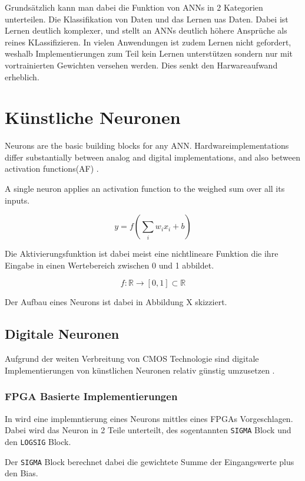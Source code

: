 \documentclass[conference]{IEEEtran}
\begin{document}
    Grundsätzlich kann man dabei die Funktion von ANNs in 2 Kategorien unterteilen.
    Die Klassifikation von Daten und das Lernen uas Daten.
    Dabei ist Lernen deutlich komplexer, und stellt an ANNs deutlich höhere Ansprüche als reines KLassifizieren.
    In vielen Anwendungen ist zudem Lernen nicht gefordert, weshalb Implementierungen zum Teil kein Lernen unterstützen sondern nur mit vortrainierten Gewichten versehen werden.
    Dies senkt den Harwareaufwand erheblich.


    \section{Künstliche Neuronen}

    Neurons are the basic building blocks for any ANN.
    Hardwareimplementations differ substantially between analog and digital implementations, and also between activation functions(AF) \cite{habib1989digital}.

    A single neuron applies an activation function to the weighed sum over all its inputs.

    \[y = f(\sum_i {w_ix_i} + b)\]

    Die Aktivierungsfunktion ist dabei meist eine nichtlineare Funktion die ihre Eingabe in einen Wertebereich zwischen 0 und 1 abbildet.

    \[ f: \mathbb{R} \to [0,1] \subset \mathbb{R} \]

    Der Aufbau eines Neurons ist dabei in Abbildung X skizziert.

    \subsection{Digitale Neuronen}

    Aufgrund der weiten Verbreitung von CMOS Technologie sind digitale Implementierungen von künstlichen Neuronen relativ günstig umzusetzen\cite{misra2010artificial} .

    \subsubsection{FPGA Basierte Implementierungen}
    In \cite{muthuramalingam2008neural} wird eine implemntierung eines Neurons mittles eines FPGAs Vorgeschlagen.
    Dabei wird das Neuron in 2 Teile unterteilt, des sogentannten \texttt{SIGMA} Block und den \texttt{LOGSIG} Block.

    Der \texttt{SIGMA} Block berechnet dabei die gewichtete Summe der Eingangswerte plus den Bias.
\end{document}
